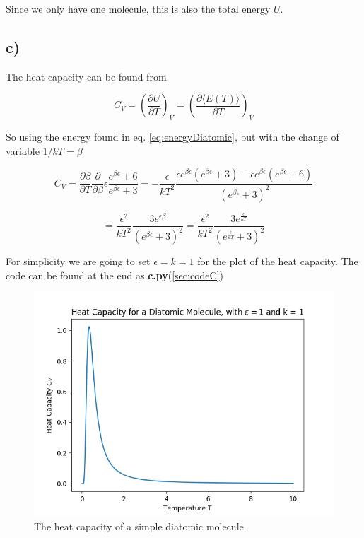 \documentclass[a4paper,norsk, 10pt]{article}
\newcommand{\pd}[2]{\frac{\partial #1}{\partial #2}}
\begin{document}
Since we only have one molecule, this is also the total energy $U$.

\subsection{c)}

The heat capacity can be found from 

\begin{equation}
C_V = \left(\pd{U}{T}\right)_V = \left(\pd{\langle E(T) \rangle }{T}\right)_V
\end{equation}\label{eq:heatCap}

So using the energy found in eq. \eqref{eq:energyDiatomic}, but with the change of variable $1/kT = \beta$

\begin{equation}
C_V = \pd{\beta}{T}\pd{}{\beta} \epsilon\frac{e^{\beta\epsilon} + 6}{e^{\beta\epsilon} +3} = -\frac{\epsilon}{kT^2}\frac{\epsilon e^{\beta\epsilon}\left(e^{\beta\epsilon} +3\right) - \epsilon e^{\beta\epsilon}\left(e^{\beta\epsilon} +6\right)}{\left(e^{\beta\epsilon} +3\right)^2}
\end{equation}

\begin{equation}
= \frac{\epsilon^2}{kT^2}\frac{3e^{\epsilon\beta}}{\left(e^{\beta\epsilon} +3\right)^2} = \frac{\epsilon^2}{kT^2}\frac{3e^{\frac{\epsilon}{kT}}}{\left(e^{\frac{\epsilon}{kT}} +3\right)^2}
\end{equation}

For simplicity we are going to set $\epsilon = k = 1$ for the plot of the heat capacity. The code can be found at the end as \textbf{c.py}(\ref{sec:codeC})

\begin{figure}[H]
\centering
\includegraphics[scale=0.5]{c_v_c.png}
\caption{The heat capacity of a simple diatomic molecule.}
\end{figure}
\end{document}
